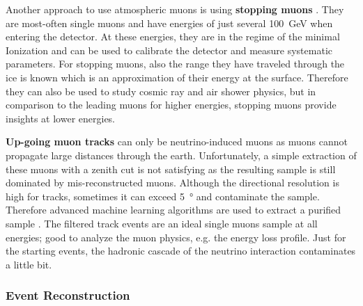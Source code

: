 Another approach to use atmospheric muons is using \textbf{stopping muons} \cite{Hoinka17Master, Ninfa19Master}.
They are most-often single muons and have energies of just several \SI{100}{GeV} when entering the detector.
At these energies, they are in the regime of the minimal Ionization and can be used to calibrate the detector and measure systematic parameters.
For stopping muons, also the range they have traveled through the ice is known which is an approximation of their energy at the surface.
Therefore they can also be used to study cosmic ray and air shower physics, but in comparison to the leading muons for higher energies, stopping muons provide insights at lower energies.

\textbf{Up-going muon tracks} can only be neutrino-induced muons as muons cannot propagate large distances through the earth.
Unfortunately, a simple extraction of these muons with a zenith cut is not satisfying as the resulting sample is still dominated by mis-reconstructed muons.
Although the directional resolution is high for tracks, sometimes it can exceed \SI{5}{\degree} and contaminate the sample.
Therefore advanced machine learning algorithms are used to extract a purified sample \cite{Stettner19ICRC}.
The filtered track events are an ideal single muons sample at all energies; good to analyze the muon physics, e.g. the energy loss profile.
Just for the starting events, the hadronic cascade of the neutrino interaction contaminates a little bit.

\subsubsection{Event Reconstruction}

